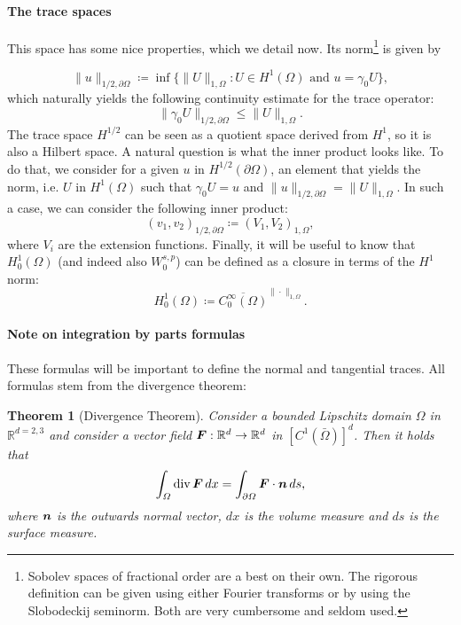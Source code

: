 \documentclass{article}
\renewcommand{\vec}{\vectorsym}
\DeclareMathOperator{\dive}{\text{div}}
\newcommand{\R}{\mathbb{R}}
\newtheorem{theorem}{Theorem}
\begin{document}
\paragraph{The trace spaces} This space has some nice properties, which we detail now. Its norm\footnote{Sobolev spaces of fractional order are a best on their own. The rigorous definition can be given using either Fourier transforms or by using the Slobodeckij seminorm. Both are very cumbersome and seldom used.} is given by 

    $$ \| u \|_{1/2,\partial\Omega} \coloneqq \inf\{\|U\|_{1,\Omega}: U \in H^1(\Omega) \text{ and } u = \gamma_0 U\}, $$
which naturally yields the following continuity estimate for the trace operator: 
    $$ \| \gamma_0 U\|_{1/2,\partial\Omega} \leq \| U \|_{1,\Omega} . $$
The trace space $H^{1/2}$ can be seen as a quotient space derived from $H^1$, so it is also a Hilbert space. A natural question is what the inner product looks like. To do that, we consider for a given $u$ in $H^{1/2}(\partial\Omega)$, an element that yields the norm, i.e. $U$ in $H^1(\Omega)$ such that $\gamma_0 U = u$ and $\| u \|_{1/2,\partial\Omega} = \| U \|_{1,\Omega}$. In such a case, we can consider the following inner product: 
    $$ (v_1, v_2)_{1/2,\partial\Omega} \coloneqq (V_1, V_2)_{1,\Omega}, $$
where $V_i$ are the extension functions. Finally, it will be useful to know that $H_0^1(\Omega)$ (and indeed also $W_0^{s,p}$) can be defined as a closure in terms of the $H^1$ norm: 
    $$ H_0^1(\Omega) \coloneqq \overline{C_0^\infty(\Omega)}^{\|\cdot \|_{1,\Omega}}. $$

\paragraph{Note on integration by parts formulas} These formulas will be important to define the normal and tangential traces. All formulas stem from the divergence theorem: 

\begin{theorem}[Divergence Theorem]
    Consider a bounded Lipschitz domain $\Omega$ in $\R^{d=2,3}$ and consider a vector field $\vec F:\R^d \to \R^d$ in $[C^1(\bar\Omega)]^d$. Then it holds that
        $$ \int_\Omega \dive \vec F\,dx = \int_{\partial\Omega}\vec F\cdot \vec n\,ds,$$
    where $\vec n$ is the outwards normal vector, $dx$ is the volume measure and $ds$ is the surface measure.
\end{theorem}
\end{document}
